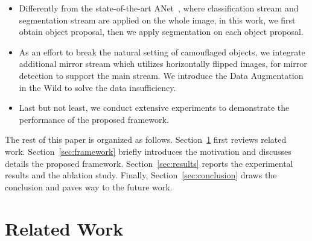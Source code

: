 \documentclass[journal]{IEEEtran}
\begin{document}
\begin{itemize}
	\item Differently from the state-of-the-art ANet~\cite{CAMO}, where classification stream and segmentation stream are applied on the whole image, in this work, we  first obtain object proposal, then we apply segmentation on each object proposal.
	\item As an effort to break the natural setting of camouflaged objects, we integrate additional mirror stream which utilizes horizontally flipped images, for mirror detection to support the main stream. We introduce the Data Augmentation in the Wild to solve the data insufficiency.
	\item Last but not least, we conduct extensive experiments to demonstrate the performance of the proposed framework. 
\end{itemize}

The rest of this paper is organized as follows. Section~\ref{sec:related} first reviews related work. Section~\ref{sec:framework}  briefly introduces the motivation and discusses details the proposed framework. Section~\ref{sec:results} reports the experimental results and the ablation study. Finally, Section~\ref{sec:conclusion} draws the conclusion and paves way to the future work.












\section{Related Work} 
\label{sec:related}
\end{document}
